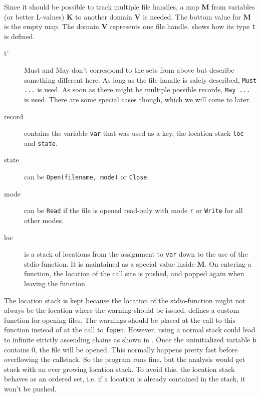 Since it should be possible to track multiple file handles, a map \textbf{M} from variables (or better L-values) \textbf{K} to another domain \textbf{V} is needed. The bottom value for \textbf{M} is the empty map.
The domain \textbf{V} represents one file handle.  shows how its type \verb|t| is defined.
\begin{description}
\item[t'] Must and May don't correspond to the sets from above but describe something different here. As long as the file handle is safely described, \verb|Must ...| is used. As soon as there might be multiple possible records, \verb|May ...| is used. There are some special cases though, which we will come to later.

\item[record] contains the variable \verb|var| that was used as a key, the location stack \verb|loc| and \verb|state|.

\item[state] can be \verb|Open(filename, mode)| or \verb|Close|.

\item[mode] can be \verb|Read| if the file is opened read-only with mode \verb|r| or \verb|Write| for all other modes.

\item[loc] is a stack of locations from the assignment to \verb|var| down to the use of the stdio-function. It is maintained as a special value inside \textbf{M}. On entering a function, the location of the call site is pushed, and popped again when leaving the function.
\end{description}
The location stack is kept because the location of the stdio-function might not always be the location where the warning should be issued.  defines a custom function for opening files. The warnings should be placed at the call to this function instead of at the call to \verb|fopen|.
However, using a normal stack could lead to infinite strictly ascending chains as shown in . Once the uninitialized variable \verb|b| contains 0, the file will be opened. This normally happens pretty fast before overflowing the callstack. So the program runs fine, but the analysis would get stuck with an ever growing location stack. To avoid this, the location stack behaves as an ordered set, i.e. if a location is already contained in the stack, it won't be pushed. %
